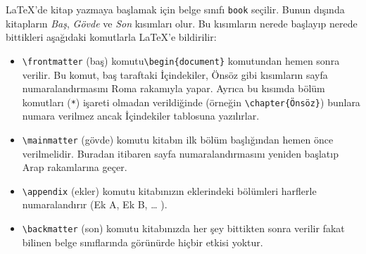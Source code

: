 \documentclass[
  letterpaper,
  DIV=11,
  numbers=noendperiod]{scrreprt}
\providecommand{\tightlist}{%
  \setlength{\itemsep}{0pt}\setlength{\parskip}{0pt}}\usepackage{longtable,booktabs,array}
\begin{document}
{\LaTeX}'de kitap yazmaya başlamak için belge sınıfı \texttt{book}
seçilir. Bunun dışında kitapların \emph{Baş}, \emph{Gövde} ve \emph{Son}
kısımları olur. Bu kısımların nerede başlayıp nerede bittikleri
aşağıdaki komutlarla {\LaTeX}'e bildirilir:

\begin{itemize}
\tightlist
\item
  \texttt{\textbackslash{}frontmatter} (baş)
  komutu\texttt{\textbackslash{}begin\{document\}} komutundan hemen
  sonra verilir. Bu komut, baş taraftaki İçindekiler, Önsöz gibi
  kısımların sayfa numaralandırmasını Roma rakamıyla yapar. Ayrıca bu
  kısımda bölüm komutları (\texttt{*}) işareti olmadan verildiğinde
  (örneğin \texttt{\textbackslash{}chapter\{Önsöz\}}) bunlara numara
  verilmez ancak İçindekiler tablosuna yazılırlar.
\item
  \texttt{\textbackslash{}mainmatter} (gövde) komutu kitabın ilk bölüm
  başlığından hemen önce verilmelidir. Buradan itibaren sayfa
  numaralandırmasını yeniden başlatıp Arap rakamlarına geçer.
\item
  \texttt{\textbackslash{}appendix} (ekler) komutu kitabınızın
  eklerindeki bölümleri harflerle numaralandırır (Ek A, Ek B, \ldots{}
  ).
\item
  \texttt{\textbackslash{}backmatter} (son) komutu kitabınızda her şey
  bittikten sonra verilir fakat bilinen belge sınıflarında görünürde
  hiçbir etkisi yoktur.
\end{itemize}
\end{document}
